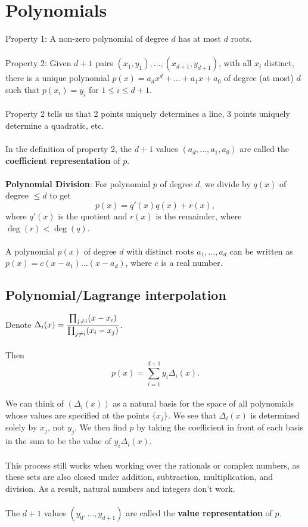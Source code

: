 \documentclass{article}
\theoremstyle{definition}
\begin{document}
\section*{Polynomials}
Property 1: A non-zero polynomial of degree $d$ has at most $d$ roots. \\ \\
Property 2: Given $d + 1$ pairs $(x_1, y_1), \dots,(x_{d + 1}, y_{d + 1})$, with all $x_i$ distinct, there is a unique polynomial $p(x) = a_dx^d + \dots + a_1x + a_0$ of degree (at most) $d$ such that $p(x_i) = y_i$ for $1 \leq i \leq d +1$. \\ \\
Property 2 tells us that 2 points uniquely determines a line, 3 points uniquely determine a quadratic, etc. \\ \\
In the definition of property 2, the $d + 1$ values $(a_d, \dots, a_1, a_0)$ are called the \textbf{coefficient representation} of $p$. \\ \\
\textbf{Polynomial Division}: For polynomial $p$ of degree $d$, we divide by $q(x)$ of degree $\leq d$ to get $$p(x) = q'(x)q(x) +r(x),$$ where $q'(x)$ is the quotient and $r(x)$ is the remainder, where $\deg(r) < \deg(q)$. \\ \\
A polynomial $p(x)$ of degree $d$ with distinct roots $a_1, \dots, a_d$ can be written as $p(x) = c(x - a_1)\dots(x - a_d)$, where $c$ is a real number.
\subsection*{Polynomial/Lagrange interpolation}
Denote $\Delta_i(x) = \mathlarger{\frac{\prod_{j \neq i}(x - x_i)}{\prod_{j \neq i}(x_i - x_j)}}$. \\ \\
Then $$p(x) = \sum_{i = 1}^{d + 1}y_i\Delta_i(x).$$ \\
We can think of $(\Delta_i(x))$ as a natural basis for the space of all polynomials whose values are specified at the points $\{x_j\}$. We see that $\Delta_i(x)$ is determined solely by $x_j$, not $y_j$. We then find $p$ by taking the coefficient in front of each basis in the sum to be the value of $y_i\Delta_i(x).$ \\ \\
This process still works when working over the rationals or complex numbers, as these sets are also closed under addition, subtraction, multiplication, and division. As a result, natural numbers and integers don't work. \\ \\
The $d + 1$ values $(y_0, \dots, y_{d + 1})$ are called the \textbf{value representation} of $p$.
\end{document}
